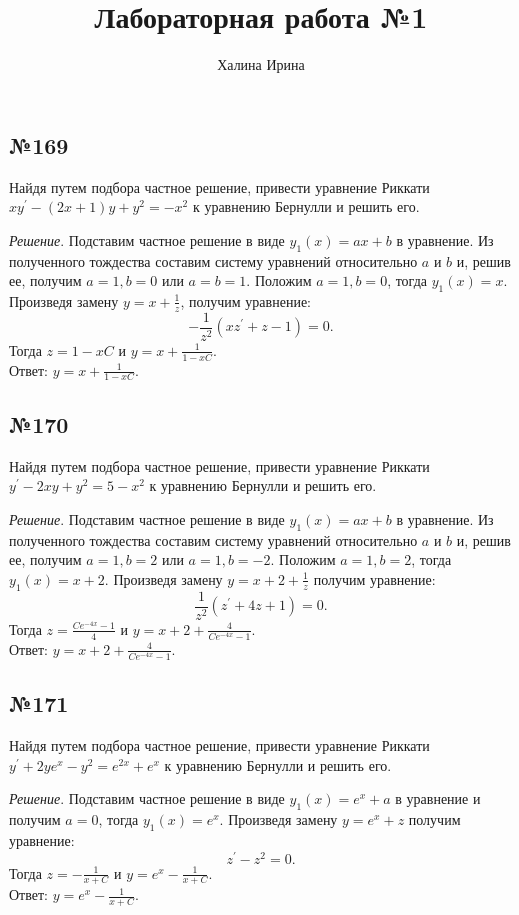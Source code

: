 \documentclass[11pt, a4paper]{article}
\title{Лабораторная работа №1}
\author{Халина Ирина}
\begin{document}
	\par\maketitle
	
	
	\subsection*{№169}
	\par
	Найдя путем подбора частное решение, привести уравнение Риккати $xy^\prime-(2x+1)y+y^2=-x^2$ к уравнению Бернулли и решить его.
	\vspace{0.2cm}
	\par
	\textit{Решение}. Подставим частное решение в виде $y_1(x)=ax+b$ в уравнение. Из полученного тождества составим систему уравнений относительно $a$ и $b$ и, решив ее, получим $a=1, b=0$ или $a=b=1$. Положим $a=1, b=0$, тогда $y_1(x)=x$. Произведя замену $y=x+\frac{1}{z}$, получим уравнение:
	$$-\frac{1}{z^2}(xz^\prime+z-1)=0.$$
	Тогда $z=1-xC$ и $y=x+\frac{1}{1-xC}$.\\
	Ответ: $y=x+\frac{1}{1-xC}$.
	\vspace{0.5cm}
	
	
	\subsection*{№170}
	\par
	Найдя путем подбора частное решение, привести уравнение Риккати $y^\prime-2xy+y^2=5-x^2$ к уравнению Бернулли и решить его.
	\vspace{0.2cm}
	\par
	\textit{Решение}. Подставим частное решение в виде $y_1(x)=ax+b$ в уравнение. Из полученного тождества составим систему уравнений относительно $a$ и $b$ и, решив ее, получим $a=1, b=2$ или $a=1, b=-2$. Положим $a=1, b=2$, тогда $y_1(x)=x+2$. Произведя замену $y=x+2+\frac{1}{z}$ получим уравнение:
	$$\frac{1}{z^2}(z^\prime+4z+1)=0.$$
	Тогда $z=\frac{Ce^{-4x}-1}{4}$ и $y=x+2+\frac{4}{Ce^{-4x}-1}$.\\	
	Ответ: $y=x+2+\frac{4}{Ce^{-4x}-1}$.
	\vspace{0.5cm}
	
	
	\subsection*{№171}
	\par
	Найдя путем подбора частное решение, привести уравнение Риккати $y^\prime+2ye^{x}-y^2=e^{2x}+e^{x}$ к уравнению Бернулли и решить его.
	\vspace{0.2cm}
	\par
	\textit{Решение}. Подставим частное решение в виде $y_1(x)=e^x+a$ в уравнение и получим $a=0$, тогда $y_1(x)=e^x$. Произведя замену $y=e^x+z$ получим уравнение:
	$$z^\prime-z^2=0.$$
	Тогда $z=-\frac{1}{x+C}$ и $y=e^x-\frac{1}{x+C}$.\\
	Ответ: $y=e^x-\frac{1}{x+C}$.
	\vspace{0.5cm}
	
\end{document}
